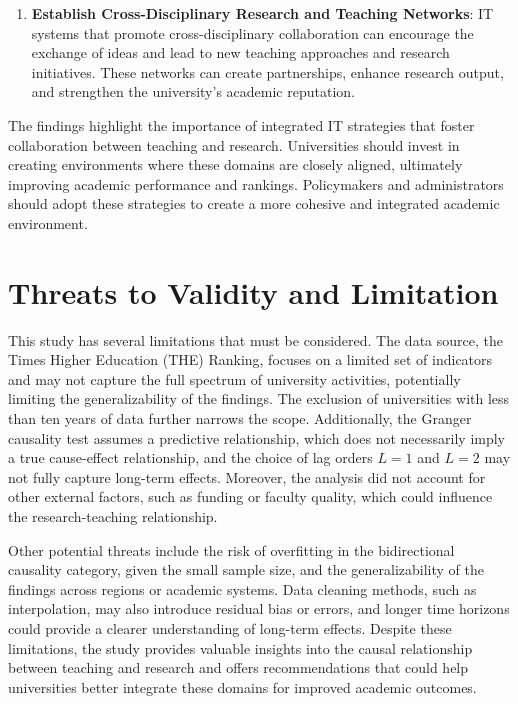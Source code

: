 \documentclass[conference]{IEEEtran}
\begin{document}
\begin{enumerate}
	\item \textbf{Establish Cross-Disciplinary Research and Teaching Networks}: IT systems that promote cross-disciplinary collaboration can encourage the exchange of ideas and lead to new teaching approaches and research initiatives. These networks can create partnerships, enhance research output, and strengthen the university’s academic reputation.
\end{enumerate}

The findings highlight the importance of integrated IT strategies that foster collaboration between teaching and research. Universities should invest in creating environments where these domains are closely aligned, ultimately improving academic performance and rankings. Policymakers and administrators should adopt these strategies to create a more cohesive and integrated academic environment.



\section{Threats to Validity and Limitation}
\label{threads_to_validity_and_limitation}

This study has several limitations that must be considered. The data source, the Times Higher Education (THE) Ranking, focuses on a limited set of indicators and may not capture the full spectrum of university activities, potentially limiting the generalizability of the findings. The exclusion of universities with less than ten years of data further narrows the scope. Additionally, the Granger causality test assumes a predictive relationship, which does not necessarily imply a true cause-effect relationship, and the choice of lag orders $L=1$ and $L=2$ may not fully capture long-term effects. Moreover, the analysis did not account for other external factors, such as funding or faculty quality, which could influence the research-teaching relationship.

Other potential threats include the risk of overfitting in the bidirectional causality category, given the small sample size, and the generalizability of the findings across regions or academic systems. Data cleaning methods, such as interpolation, may also introduce residual bias or errors, and longer time horizons could provide a clearer understanding of long-term effects. Despite these limitations, the study provides valuable insights into the causal relationship between teaching and research and offers recommendations that could help universities better integrate these domains for improved academic outcomes.
\end{document}
